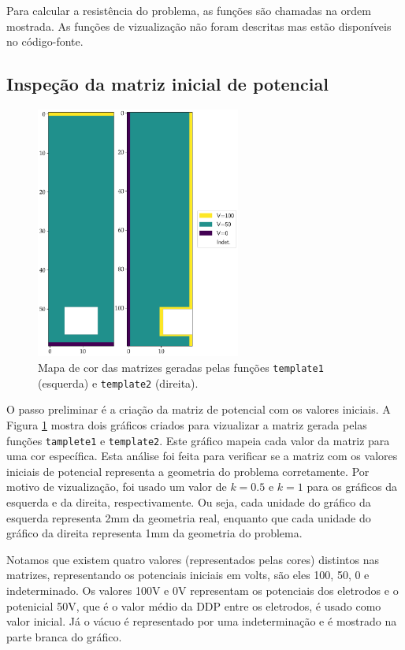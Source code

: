 \documentclass{aleph-revista}
\begin{document}
Para calcular a resistência do problema, as funções são chamadas na ordem mostrada. As funções de vizualização não foram descritas mas estão disponíveis no código-fonte.



\subsection{Inspeção da matriz inicial de potencial}

\begin{figure}[!h]
  \centering
  \includegraphics[width=0.6\textwidth]{template}
  \caption{Mapa de cor das matrizes geradas pelas funções \texttt{template1} (esquerda) e \texttt{template2} (direita).}
  \label{fig:template}
\end{figure}

O passo preliminar é a criação da matriz de potencial com os valores iniciais.  A Figura \ref{fig:template} mostra dois gráficos criados para vizualizar a matriz gerada pelas funções \texttt{tamplete1} e \texttt{template2}. Este gráfico mapeia cada valor da matriz para uma cor específica. Esta análise foi feita para verificar se a matriz com os valores iniciais de potencial representa a geometria do problema corretamente. Por motivo de vizualização, foi usado um valor de $k=0.5$ e $k=1$ para os gráficos da esquerda e da direita, respectivamente. Ou seja, cada unidade do gráfico da esquerda representa 2mm da geometria real, enquanto que cada unidade do gráfico da direita representa 1mm da geometria do problema.


Notamos que existem quatro valores (representados pelas cores) distintos nas matrizes, representando os potenciais iniciais em volts, são eles 100, 50, 0 e indeterminado. Os valores 100V e 0V representam os potenciais dos eletrodos e o potenicial 50V, que é o valor médio da DDP entre os eletrodos, é usado como valor inicial. Já o vácuo é representado por uma indeterminação e é mostrado na parte branca do gráfico.
\end{document}
